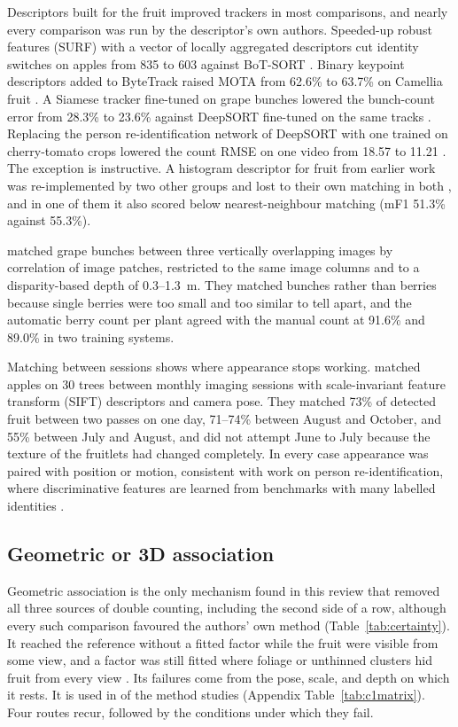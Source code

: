 Descriptors built for the fruit improved trackers in most comparisons, and nearly every comparison was run by the descriptor's own authors. Speeded-up robust features (SURF) with a vector of locally aggregated descriptors cut identity switches on apples from 835 to 603 against BoT-SORT \citep{yang2024automatic}. Binary keypoint descriptors added to ByteTrack raised MOTA from 62.6\% to 63.7\% on Camellia fruit \citep{dong2025fruit}. A Siamese tracker fine-tuned on grape bunches lowered the bunch-count error from 28.3\% to 23.6\% against DeepSORT fine-tuned on the same tracks \citep{ahmedtaristizabal2024field}. Replacing the person re-identification network of DeepSORT with one trained on cherry-tomato crops lowered the count RMSE on one video from 18.57 to 11.21 \citep{meng2024real}. The exception is instructive. A histogram descriptor for fruit from earlier work was re-implemented by two other groups and lost to their own matching in both \citep{fusaro2026horticultural,lei2025spatio}, and in one of them it also scored below nearest-neighbour matching (mF1 51.3\% against 55.3\%).

\citet{zabawa2022image} matched grape bunches between three vertically overlapping images by correlation of image patches, restricted to the same image columns and to a disparity-based depth of 0.3--1.3~m. They matched bunches rather than berries because single berries were too small and too similar to tell apart, and the automatic berry count per plant agreed with the manual count at 91.6\% and 89.0\% in two training systems.

Matching between sessions shows where appearance stops working. \citet{mirbod2021field} matched apples on 30 trees between monthly imaging sessions with scale-invariant feature transform (SIFT) descriptors and camera pose. They matched 73\% of detected fruit between two passes on one day, 71--74\% between August and October, and 55\% between July and August, and did not attempt June to July because the texture of the fruitlets had changed completely. In every case appearance was paired with position or motion, consistent with work on person re-identification, where discriminative features are learned from benchmarks with many labelled identities \citep{ye2022deep}.

\subsection{Geometric or 3D association}\label{sec:mech-geom}
Geometric association is the only mechanism found in this review that removed all three sources of double counting, including the second side of a row, although every such comparison favoured the authors' own method (Table~\ref{tab:certainty}). It reached the reference without a fitted factor while the fruit were visible from some view, and a factor was still fitted where foliage or unthinned clusters hid fruit from every view \citep{wang2013automated}. Its failures come from the pose, scale, and depth on which it rests. It is used in \nGeom of the \nMethod method studies (Appendix Table~\ref{tab:c1matrix}). Four routes recur, followed by the conditions under which they fail.

